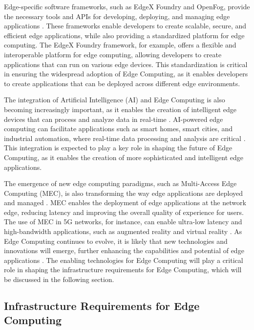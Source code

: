 \documentclass[11pt,a4paper]{article}
\begin{document}
Edge-specific software frameworks, such as EdgeX Foundry and OpenFog, provide the necessary tools and APIs for developing, deploying, and managing edge applications \cite{arxiv:1911.02794}. These frameworks enable developers to create scalable, secure, and efficient edge applications, while also providing a standardized platform for edge computing. The EdgeX Foundry framework, for example, offers a flexible and interoperable platform for edge computing, allowing developers to create applications that can run on various edge devices. This standardization is critical in ensuring the widespread adoption of Edge Computing, as it enables developers to create applications that can be deployed across different edge environments.

The integration of Artificial Intelligence (AI) and Edge Computing is also becoming increasingly important, as it enables the creation of intelligent edge devices that can process and analyze data in real-time \cite{arxiv:2003.12172}. AI-powered edge computing can facilitate applications such as smart homes, smart cities, and industrial automation, where real-time data processing and analysis are critical \cite{arxiv:1912.00595}. This integration is expected to play a key role in shaping the future of Edge Computing, as it enables the creation of more sophisticated and intelligent edge applications.

The emergence of new edge computing paradigms, such as Multi-Access Edge Computing (MEC), is also transforming the way edge applications are deployed and managed \cite{arxiv:1906.08452}. MEC enables the deployment of edge applications at the network edge, reducing latency and improving the overall quality of experience for users. The use of MEC in 5G networks, for instance, can enable ultra-low latency and high-bandwidth applications, such as augmented reality and virtual reality \cite{arxiv:2107.13374}. As Edge Computing continues to evolve, it is likely that new technologies and innovations will emerge, further enhancing the capabilities and potential of edge applications \cite{arxiv:2109.12195}. The enabling technologies for Edge Computing will play a critical role in shaping the infrastructure requirements for Edge Computing, which will be discussed in the following section.


\subsection{Infrastructure Requirements for Edge Computing}
\end{document}
